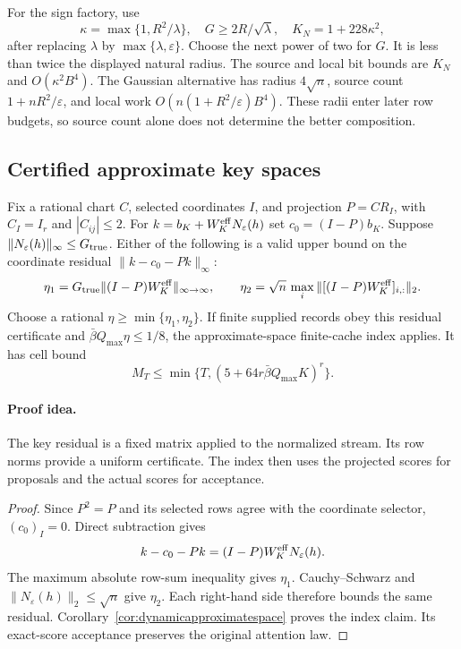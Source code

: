 For the sign factory, use
\[
 \kappa=\max\{1,R^2/\lambda\},\quad
 G\ge2R/\sqrt\lambda,\quad K_N=1+228\kappa^2,
\]
after replacing $\lambda$ by $\max\{\lambda,\varepsilon\}$.
Choose the next power of two for $G$. It is less than twice
the displayed natural radius. The source and local bit bounds
are $K_N$ and $O(\kappa^2B^4)$.
The Gaussian alternative has radius $4\sqrt n$, source count
$1+nR^2/\varepsilon$, and local work
$O(n(1+R^2/\varepsilon)B^4)$.
These radii enter later row budgets, so source count alone does
not determine the better composition.

\subsection{Certified approximate key spaces}

\begin{proposition}
\label{prop:checkpoint-key-residual}
Fix a rational chart $C$, selected coordinates $I$, and projection
$P=CR_I$, with $C_I=I_r$ and $|C_{ij}|\le2$.
For $k=b_K+W_K^{\rm eff}N_\varepsilon(h)$ set
$c_0=(I-P)b_K$. Suppose
$\|N_\varepsilon(h)\|_\infty\le G_{\rm true}$.
Either of the following is a valid upper bound on the coordinate
residual $\|k-c_0-Pk\|_\infty$:
\[
 \eta_1=G_{\rm true}\|(I-P)W_K^{\rm eff}\|_{\infty\to\infty},
 \qquad
 \eta_2=\sqrt n\,\max_i
       \|[(I-P)W_K^{\rm eff}]_{i,:}\|_2.
\]
Choose a rational $\eta\ge\min\{\eta_1,\eta_2\}$.
If finite supplied records obey this residual certificate and
$\bar\beta Q_{\max}\eta\le1/8$, the approximate-space finite-cache
index applies. It has cell bound
\[
 M_T\le\min\{T,(5+64r\bar\beta Q_{\max}K)^r\}.
\]
\end{proposition}

\paragraph{Proof idea.}
The key residual is a fixed matrix applied to the normalized
stream. Its row norms provide a uniform certificate. The index
then uses the projected scores for proposals and the actual
scores for acceptance.

\begin{proof}
Since $P^2=P$ and its selected rows agree with the coordinate
selector, $(c_0)_I=0$. Direct subtraction gives
\[
 k-c_0-Pk=(I-P)W_K^{\rm eff}N_\varepsilon(h).
\]
The maximum absolute row-sum inequality gives $\eta_1$.
Cauchy--Schwarz and
$\|N_\varepsilon(h)\|_2\le\sqrt n$ give $\eta_2$.
Each right-hand side therefore bounds the same residual.
Corollary~\ref{cor:dynamicapproximatespace} proves the index claim.
Its exact-score acceptance preserves the original attention law.
\end{proof}


